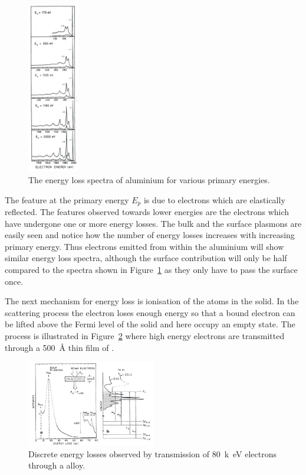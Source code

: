 \begin{figure}[htbp]
\centering
\includegraphics[width=0.2\textwidth]{figures/02_09}
\caption{The energy loss spectra of aluminium for various primary energies.}
\label{fig:plasmon_spectra}
\end{figure}

The feature at the primary energy $E_{p}$ is due to electrons which are elastically reflected. The features observed towards lower energies are the electrons which have undergone one or more energy losses. The bulk and the surface plasmons are easily seen and notice how the number of energy losses increases with increasing primary energy. Thus electrons emitted from within the aluminium will show similar energy loss spectra, although the surface contribution will only be half compared to the spectra shown in Figure~\ref{fig:plasmon_spectra} as they only have to pass the surface once.

The next mechanism for energy loss is ionisation of the atoms in the solid. In the scattering process the electron loses enough energy so that a bound electron can be lifted above the Fermi level of the solid and here occupy an empty state. The process is illustrated in Figure~\ref{fig:discrete_losses} where high energy electrons are transmitted through a \SI{500}{\angstrom} thin film of .

\begin{figure}[htbp]
\centering
\includegraphics[width=0.5\textwidth]{figures/02_10}
\caption{Discrete energy losses observed by transmission of \SI{80}{k\electronvolt} electrons through a  alloy.}
\label{fig:discrete_losses}
\end{figure}

